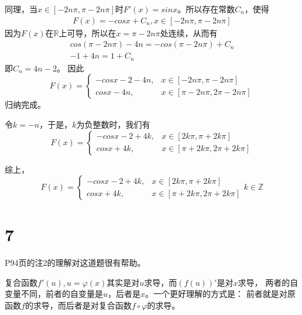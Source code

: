 \documentclass{article}
\begin{document}
\begin{itemize}
        同理，当$x \in [-2n \pi, \pi - 2n \pi]$时$F'(x) = sin x$。所以存在常数$C_n$，使得
        \begin{align*}
          F(x) = -cos x + C_n, x \in [-2n \pi, \pi - 2n \pi]
        \end{align*}
        因为$F(x)$在$\mathbb{R}$上可导，所以在$x = \pi - 2n \pi$处连续，从而有
        \begin{align*}
          cos (\pi - 2n \pi) - 4n = -cos (\pi - 2n \pi) + C_n \\
          -1 + 4n = 1 + C_n
        \end{align*}
        即$C_n = 4n - 2$。
        因此
        \begin{equation*}
          F(x) =
          \begin{cases}
            -cosx - 2 - 4n, & x \in [-2n \pi, \pi - 2n \pi]       \\
            cosx - 4n,      & x \in [\pi - 2n \pi, 2\pi - 2n \pi]
          \end{cases}
        \end{equation*}
        归纳完成。

        令$k = -n$，于是，$k$为负整数时，我们有
        \begin{equation*}
          F(x) =
          \begin{cases}
            -cosx - 2 + 4k, & x \in [2k \pi, \pi + 2k \pi]       \\
            cosx + 4k,      & x \in [\pi + 2k \pi, 2\pi + 2k \pi]
          \end{cases}
        \end{equation*}

        综上，
        \begin{equation*}
          F(x) =
          \begin{cases}
            -cosx - 2 + 4k, & x \in [2k \pi, \pi + 2k \pi]        \\
            cosx + 4k,      & x \in [\pi + 2k \pi, 2\pi + 2k \pi]
          \end{cases}
          k \in \mathbb{Z}
        \end{equation*}
        

\end{itemize}



\section*{7}

\begin{zremark}
  P94页的注2的理解对这道题很有帮助。

  复合函数$f'(u), u = \varphi (x)$其实是对$u$求导，而$(f(u))'$是对$x$求导，
  两者的自变量不同，前者的自变量是$u$，后者是$x$。一个更好理解的方式是：
  前者就是对原函数$f$的求导，而后者是对复合函数$f \circ \varphi$的求导。
\end{zremark}
\end{document}
